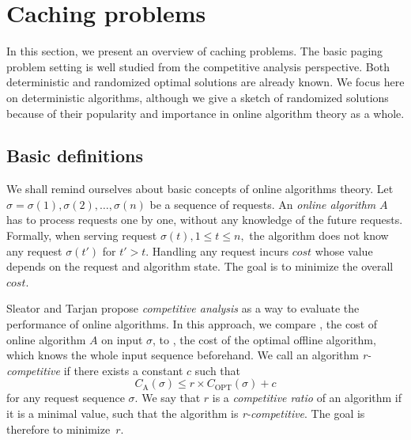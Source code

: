 \section{Caching problems}
\label{caching_problems}
In this section, we present an overview of caching problems. The basic paging 
problem setting is well studied from the competitive analysis perspective. 
Both deterministic and randomized optimal solutions are already known. We focus 
here on deterministic algorithms, although we give a sketch of randomized solutions 
because of their popularity and importance in online algorithm theory as a 
whole. 
\subsection{Basic definitions}
We shall remind ourselves about basic concepts of online algorithms theory. 
Let $\sigma = \sigma(1), \sigma(2), \ldots, \sigma(n)$ be a sequence of 
requests. An \textit{online algorithm} $A$ has to process requests one by one, 
without any knowledge of the future requests. Formally, when 
serving request 
$\sigma(t), 1 \leq t \leq n,$ the algorithm does not know any request 
$\sigma(t')$ for $t'>t$. Handling any request incurs $cost$ whose value  
depends on the request and algorithm state. The goal is to minimize the overall 
$cost$.

Sleator and Tarjan \cite{tarjan} propose
\textit{competitive analysis} as a way to evaluate the performance of online 
algorithms. In this approach, we compare , the cost of online algorithm 
$A$ on input $\sigma$, to , the cost of the optimal offline algorithm, 
which knows the whole input sequence beforehand. We call an algorithm 
\textit{r-competitive} if there exists a constant $c$ such that
$$C_{\mathrm{A}}(\sigma) \leq r \times C_{\mathrm{OPT}}(\sigma) + c$$
for any request sequence $\sigma$. We say that $r$ is a \textit{competitive ratio}
of an algorithm if it is a minimal value, such that the algorithm is 
\textit{r-competitive}. The goal is therefore to minimize~$r$.

